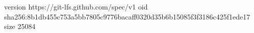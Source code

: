 version https://git-lfs.github.com/spec/v1
oid sha256:8b1db455c753a5bb7805c9776bacaff0320d35b6b15085f3f3186c425f1ede17
size 25084
